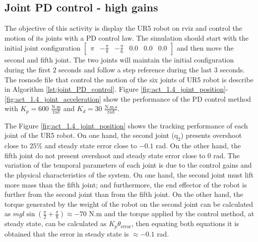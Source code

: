 \subsection{Joint PD control - high gains}
The objective of this activity is display the UR5 robot on rviz and control the motion of its joints with a PD control law. The simulation should start with the initial joint configuration $\begin{bmatrix} \pi & -\frac{\pi}{8} & -\frac{\pi}{6} & 0.0 & 0.0 & 0.0 \end{bmatrix}$ and then move the second and fifth joint. The two joints will maintain the initial configuration during the first $2$ seconds and follow a step reference during the last $3$ seconds. The rosnode file that control the motion of the six joints of UR5 robot is describe in Algorithm \ref{lst:joint_PD_control}. Figure \ref{fig:act_1.4_joint_position}-\ref{fig:act_1.4_joint_acceleration} show the performance of the PD control method with $K_p=600$ $\mathrm{\frac{N.m}{rad}}$ and $K_d=30$ $\mathrm{\frac{N.m.s}{rad}}$. 

The Figure \ref{fig:act_1.4_joint_position} shows the tracking performance of each joint of the UR5 robot. On one hand, the second joint ($\mathrm{q}_2$) presents overshoot close to $25\%$ and steady state error close to $-0.1$ rad. On the other hand, the fifth joint do not present overshoot and steady state error close to $0$ rad. The variation of the temporal parameters of each joint is due to the control gains and the physical characteristics of the system. On one hand, the second joint must lift more mass than the fifth joint; and furthermore, the end effector of the robot is further from the second joint than from the fifth joint. On the other hand, the torque generated by the weight of the robot on the second joint can be calculated as $m g l \sin({\frac{\pi}{2} + \frac{\pi}{8}}) \approx -70$ N.m and the torque applied by the control method, at steady state, can be calculated as $K_p \theta_{\mathrm{error}}$, then equating both equations it is obtained that the error in steady state is $\approx -0.1$ rad.


